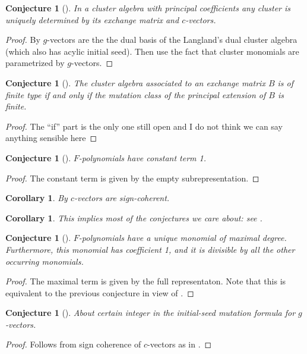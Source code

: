 \documentclass{amsart}
\newtheorem{corollary}[theorem]{Corollary}
\newtheorem{conjecture}[theorem]{Conjecture}
\begin{document}
\begin{conjecture}[{\cite[Conjecture 4.7]{FZ07}}]
  In a cluster algebra with principal coefficients any cluster is uniquely determined by its exchange matrix and $c$-vectors.
\end{conjecture}
\begin{proof}
  By \cite{NZ12} $g$-vectors are the the dual basis of the Langland's dual cluster algebra (which also has acylic initial seed). 
  Then use the fact that cluster monomials are parametrized by $g$-vectors.
\end{proof}

\begin{conjecture}[{\cite[Conjecture 4.8]{FZ07}}]
  The cluster algebra associated to an exchange matrix $B$ is of finite type if and only if the mutation class of the principal extension of $B$ is finite.
\end{conjecture}
\begin{proof}
  The ``if'' part is the only one still open and I do not think we can say anything sensible here
\end{proof}

\begin{conjecture}[{\cite[Conjecture 5.4]{FZ07}}]
  $F$-polynomials have constant term 1.
\end{conjecture}
\begin{proof}
  The constant term is given by the empty subrepresentation.
\end{proof}
\begin{corollary}
  By \cite[Proposition 5.6]{FZ07} $c$-vectors are sign-coherent.
\end{corollary}
\begin{corollary}
  This implies most of the conjectures we care about: see \cite[Proposition 4.2]{NZ12}.
\end{corollary}

\begin{conjecture}[{\cite[Conjecture 5.5]{FZ07}}]
  $F$-polynomials have  a unique monomial of maximal degree. 
  Furthermore, this monomial has coefficient 1, and it is divisible by all the other occurring monomials.
\end{conjecture}
\begin{proof}
  The maximal term is given by the full representaton.
  Note that this is equivalent to the previous conjecture in view of \cite[Proposition 5.3]{FZ07}.
\end{proof}

\begin{conjecture}[{\cite[Conjecture 6.10]{FZ07}}]
  About certain integer in the initial-seed mutation formula for $g$-vectors.
\end{conjecture}
\begin{proof}
  Follows from sign coherence of $c$-vectors as in \cite[Proposition 4.2]{NZ12}.
\end{proof}
\end{document}

